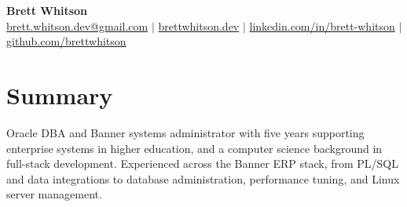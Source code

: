 \documentclass[letterpaper,11pt]{article}
\begin{document}
\begin{center}
  {\Huge\textbf{Brett Whitson}} \\ \vspace{4pt}
  \small
  \href{mailto:brett.whitson.dev@gmail.com}{brett.whitson.dev@gmail.com} $|$
  \href{https://brettwhitson.dev}{brettwhitson.dev} $|$
  \href{https://www.linkedin.com/in/brett-whitson}{linkedin.com/in/brett-whitson} $|$
  \href{https://github.com/brettwhitson}{github.com/brettwhitson}
\end{center}

\section{Summary}
\small
Oracle DBA and Banner systems administrator with five years supporting enterprise systems in higher
education, and a computer science background in full-stack development. Experienced across the
Banner ERP stack, from PL/SQL and data integrations to database administration, performance tuning,
and Linux server management.
\normalsize

\end{document}
